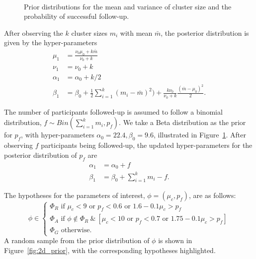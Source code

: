 \documentclass{article} %
\begin{document}
\begin{figure}
   \centering
   \quad
   \\
   \quad
   \caption{Prior distributions for the mean and variance of cluster size and the probability of successful follow-up.}
   \label{fig:priors1}
\end{figure}

After observing the $k$ cluster sizes $m_{i}$ with mean $\bar{m}$, the posterior distribution is given by the hyper-parameters
\begin{align}
\mu_{1} &= \frac{\nu_{0}\mu_{0} + k \bar{m}}{\nu_{0} + k} \\
\nu_{1} &= \nu_{0} + k \\
\alpha_{1} &= \alpha_{0} + k/2 \\
\beta_{1} & = \beta_{0} + \frac{1}{2}\sum_{i=1}^{k}(m_{i} - \bar{m})^{2}) + \frac{k\nu_{0}}{\nu_{0} + k} \frac{(\bar{m}-\mu_{0})^{2}}{2}.
\end{align}

The number of participants followed-up is assumed to follow a binomial distribution, $f \sim Bin(\sum_{i=1}^{k} m_{i}, p_{f})$. We take a Beta distribution as the prior for $p_{f}$, with hyper-parameters $\alpha_{0} = 22.4, \beta_{0} = 9.6$, illustrated in Figure~\ref{fig:priors1}. After observing $f$ participants being followed-up, the updated hyper-parameters for the posterior distribution of $p_{f}$ are
\begin{align}
\alpha_{1} &= \alpha_{0} + f \\
\beta_{1} & = \beta_{0} + \sum_{i=1}^{k} m_{i} - f.
\end{align}

The hypotheses for the parameters of interest, $\phi = (\mu_{c}, p_{f})$, are as follows:
\begin{equation}\label{eqn:hypotheses1}
  \phi \in \begin{cases}
               \Phi_{R} \text{ if } \mu_{c} < 9 \text{ or } p_{f} < 0.6 \text{ or } 1.6 - 0.1\mu_{c} > p_{f} \\
               \Phi_{A} \text{ if } \phi \not\in \Phi_{R} ~\&~ [\mu_{c} < 10 \text{ or } p_{f} < 0.7 \text{ or } 1.75 - 0.1\mu_{c} > p_{f}] \\
               \Phi_{G} \text{ otherwise.}
            \end{cases}
\end{equation}
A random sample from the prior distribution of $\phi$ is shown in Figure~\ref{fig:2d_prior}, with the corresponding hypotheses highlighted.
\end{document}
